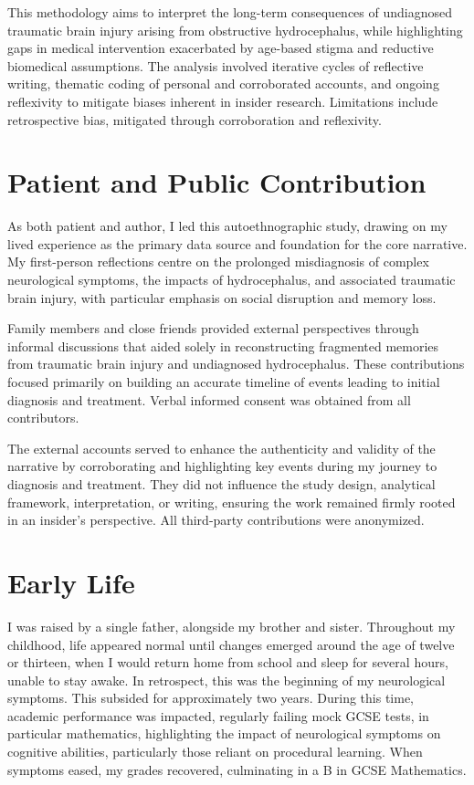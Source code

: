 \documentclass{article}
\begin{document}
This methodology aims to interpret the long-term consequences of undiagnosed traumatic brain injury arising from obstructive hydrocephalus, while highlighting gaps in medical intervention exacerbated by age-based stigma and reductive biomedical assumptions. The analysis involved iterative cycles of reflective writing, thematic coding of personal and corroborated accounts, and ongoing reflexivity to mitigate biases inherent in insider research. Limitations include retrospective bias, mitigated through corroboration and reflexivity.

\section*{Patient and Public Contribution}
As both patient and author, I led this autoethnographic study, drawing on my lived experience as the primary data source and foundation for the core narrative. My first-person reflections centre on the prolonged misdiagnosis of complex neurological symptoms, the impacts of hydrocephalus, and associated traumatic brain injury, with particular emphasis on social disruption and memory loss.

Family members and close friends provided external perspectives through informal discussions that aided solely in reconstructing fragmented memories from traumatic brain injury and undiagnosed hydrocephalus. These contributions focused primarily on building an accurate timeline of events leading to initial diagnosis and treatment. Verbal informed consent was obtained from all contributors.

The external accounts served to enhance the authenticity and validity of the narrative by corroborating and highlighting key events during my journey to diagnosis and treatment. They did not influence the study design, analytical framework, interpretation, or writing, ensuring the work remained firmly rooted in an insider’s perspective. All third-party contributions were anonymized.

\section*{Early Life}
I was raised by a single father, alongside my brother and sister. Throughout my childhood, life appeared normal until changes emerged around the age of twelve or thirteen, when I would return home from school and sleep for several hours, unable to stay awake. In retrospect, this was the beginning of my neurological symptoms. This subsided for approximately two years. During this time, academic performance was impacted, regularly failing mock GCSE tests, in particular mathematics, highlighting the impact of neurological symptoms on cognitive abilities, particularly those reliant on procedural learning. When symptoms eased, my grades recovered, culminating in a B in GCSE Mathematics.
\end{document}
